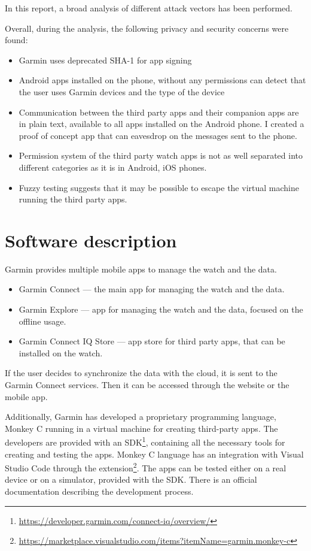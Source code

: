 In this report, a broad analysis of different attack vectors has been performed.

Overall, during the analysis, the following privacy and security concerns were found:
\begin{itemize}
    \item Garmin uses deprecated SHA-1 for app signing
    \item Android apps installed on the phone, without any permissions can detect that the user uses Garmin devices and the type of the device
    \item Communication between the third party apps and their companion apps are in plain text, available to all apps installed on the Android phone.
    I created a proof of concept app that can eavesdrop on the messages sent to the phone.
    \item Permission system of the third party watch apps is not as well separated into different categories as it is in Android, iOS phones.
    \item Fuzzy testing suggests that it may be possible to escape the virtual machine running the third party apps.
\end{itemize}


\section{Software description}
Garmin provides multiple mobile apps to manage the watch and the data.
\begin{itemize}
    \item Garmin Connect — the main app for managing the watch and the data.
    \item Garmin Explore — app for managing the watch and the data, focused on the offline usage.
    \item Garmin Connect IQ Store — app store for third party apps, that can be installed on the watch.
\end{itemize}

If the user decides to synchronize the data with the cloud, it is sent to the Garmin Connect services.
Then it can be accessed through the website or the mobile app.

Additionally, Garmin has developed a proprietary programming language, Monkey C running in a virtual machine for creating third-party apps.
The developers are provided with an SDK\footnote{\url{https://developer.garmin.com/connect-iq/overview/}}, containing all the necessary tools for creating and testing the apps.
Monkey C language has an integration with Visual Studio Code through the extension\footnote{\url{https://marketplace.visualstudio.com/items?itemName=garmin.monkey-c}}.
The apps can be tested either on a real device or on a simulator, provided with the SDK\@.
There is an official documentation describing the development process.

